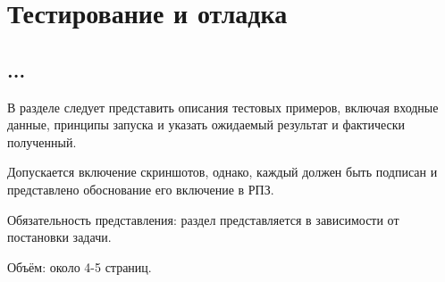 \chapter{Тестирование и отладка}\label{chap4_soft_testing}
\section{...}

В разделе следует представить описания тестовых примеров, включая входные данные, принципы запуска и указать ожидаемый результат и фактически полученный.

Допускается включение скриншотов, однако, каждый должен быть подписан и представлено обоснование его включение в РПЗ.

Обязательность представления: раздел представляется в зависимости от постановки задачи.

Объём: около 4-5 страниц.




